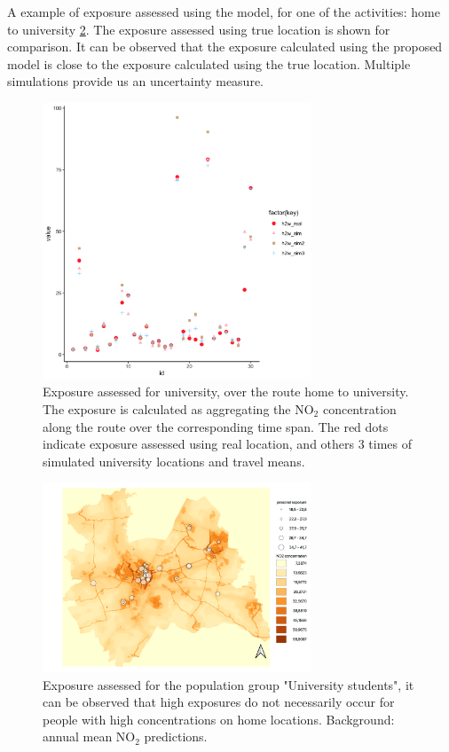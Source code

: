 \documentclass[]{article}
\begin{document}
A example of exposure assessed using the model, for one of the activities: home to university \cref{sims}. The exposure assessed using true location is shown for comparison. It can be observed that the exposure calculated using the proposed model is close to the exposure calculated using the true location. Multiple simulations provide us an uncertainty measure.  
\begin{figure}[h]
    \centering
    \includegraphics[width=8cm]{figure/sims.png}
    \caption{Exposure assessed for university, over the route home to university. The exposure is calculated as aggregating the NO$_2$ concentration along the route over the corresponding time span. The red dots indicate exposure assessed using real location, and others 3 times of simulated university locations and travel means.}
    \label{sims}
\end{figure}

\begin{figure}[h]
    \centering
    \includegraphics[width=8cm]{figure/exp49Utrecht.png}
    \caption{Exposure assessed for the population group "University students", it can be observed that high exposures do not necessarily occur for people with high concentrations on home locations. Background: annual mean NO$_2$ predictions.}
    \label{sims}
\end{figure}
\end{document}
